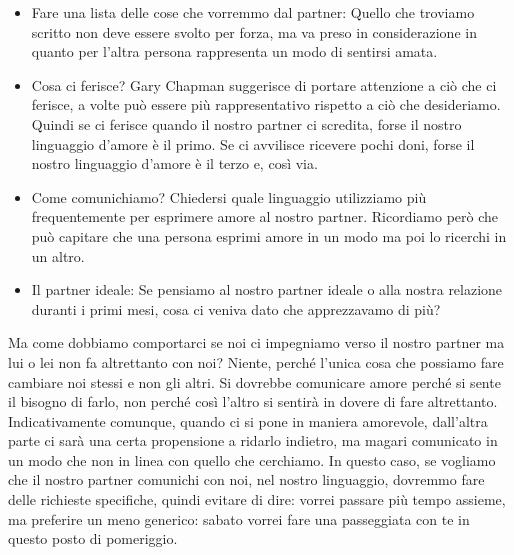 \documentclass[12pt]{book} %
\begin{document}
\begin{itemize}
\item Fare una lista delle cose che vorremmo dal partner: Quello che troviamo scritto non deve essere svolto per forza,
ma va preso in considerazione in quanto per l'altra persona rappresenta un modo di sentirsi amata.
\item Cosa ci ferisce? Gary Chapman suggerisce di portare attenzione a ciò che ci ferisce, a volte può essere più
rappresentativo rispetto a ciò che desideriamo. Quindi se ci ferisce quando il nostro partner ci scredita, forse il
nostro linguaggio d'amore è il primo. Se ci avvilisce ricevere pochi doni, forse il nostro linguaggio d'amore è il
terzo e, così via.
\item Come comunichiamo? Chiedersi quale linguaggio utilizziamo più frequentemente per esprimere amore al nostro
partner. Ricordiamo però che può capitare che una persona esprimi amore in un modo ma poi lo ricerchi in un altro.
\item Il partner ideale: Se pensiamo al nostro partner ideale o alla nostra relazione duranti i primi mesi, cosa ci
veniva dato che apprezzavamo di più?
\end{itemize}

Ma come dobbiamo comportarci se noi ci impegniamo verso il nostro partner ma lui o lei non fa altrettanto con noi?
Niente, perché l'unica cosa che possiamo fare cambiare noi stessi e non gli altri. Si dovrebbe comunicare amore perché
si sente il bisogno di farlo, non perché così l'altro si sentirà in dovere di fare altrettanto.
Indicativamente comunque, quando ci si pone in maniera amorevole, dall'altra parte ci sarà una certa propensione a
ridarlo indietro, ma magari comunicato in un modo che non in linea con quello che cerchiamo. In questo caso, se vogliamo
che il nostro partner comunichi con noi, nel nostro linguaggio, dovremmo fare delle richieste specifiche, quindi evitare
di dire: vorrei passare più tempo assieme, ma preferire un meno generico: sabato vorrei fare una passeggiata con te in
questo posto di pomeriggio.
\end{document}
